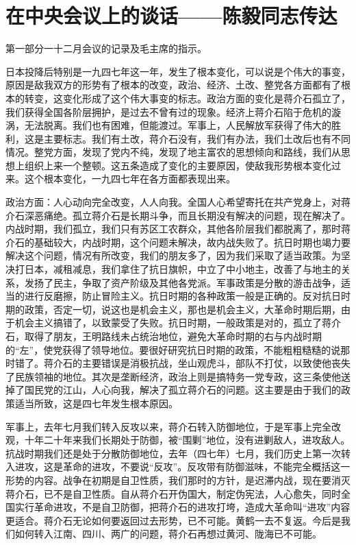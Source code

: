 \section[在中央会议上的谈话——陈毅同志传达（一九四七年十二月）]{在中央会议上的谈话——陈毅同志传达}


第一部分一十二月会议的记录及毛主席的指示。

日本投降后特别是一九四七年这一年，发生了根本变化，可以说是个伟大的事变，原因是敌我双方的形势有了根本的改变，政治、经济、土改、整党各方面都有了根本的转变，这变化形成了这个伟大事变的标志。政治方面的变化是蒋介石孤立了，我们获得全国各阶层拥护，是过去不曾有过的现象。经济上蒋介石陷于危机的漩涡，无法脱离。我们也有困难，但能渡过。军事上，人民解放军获得了伟大的胜利，这是主要标志。我们有土改，蒋介石没有，我们有办法，我们土改后也有不同情况。整党方面，发现了党内不纯，发现了地主富农的思想倾向和路线，我们从思想上组织上来一个整顿。这五条造成了变化的主要原因，使敌我形势根本变化过来。这个根本变化，一九四七年在各方面都表现出来。

政治方面：人心动向完全改变，人人向我。全国人心希望寄托在共产党身上，对蒋介石深恶痛绝。孤立蒋介石是长期斗争，而且长期没有解决的问题，现在解决了。内战时期，我们孤立，我们只有苏区工农群众，其他各阶层我们都脱离了，那时蒋介石的基础较大，内战时期，这个问题未解决，故内战失败了。抗日时期也竭力要解决这个问题，情况有所改变，我们的朋友多了，因为我们采取了适当政策。为坚决打日本，减租减息，我们拿住了抗日旗帜，中立了中小地主，改善了与地主的关系，发扬了民主，争取了资产阶级及其他各党派。军事政策是分散的游击战争，适当的进行反磨擦，防止冒险主义。抗日时期的各种政策一般是正确的。反对抗日时期的政策，否定一切，说这也是机会主义，那也是机会主义，大革命时期后期，由于机会主义搞错了，以致蒙受了失败。抗日时期，一般政策是对的，孤立了蒋介石，取得了朋友，王明路线未占统治地位，避免大革命时期的右与内战时期的“左”，使党获得了领导地位。要很好研究抗日时期的政策，不能粗粗糙糙的说那时错了。蒋介石的主要错误是消极抗战，坐山观虎斗，部队不打仗，以致使他丧失了民族领袖的地位。其次是垄断经济，政治上则是搞特务一党专政，这三条使他送掉了国民党的江山，人心向我，解决了孤立蒋介石的问题。这主要是由于我们的政策适当所致，这是四七年发生根本原因。

军事上，去年七月我们转入反攻以来，蒋介石转入防御地位，于是军事上完全改观，十年二十年来我们长期处于防御，被“围剿”地位，没有进剿敌人，进攻敌人。抗战时期我们还是处于分散防御地位，去年（四七年）七月，我们历史上第一次转入进攻，这是革命的进攻，不要说“反攻”。反攻带有防御滋味，不能完全概括这一形势的内容。战争在初期是自卫性质，我们那时的方针，是迟滞内战，现在要消灭蒋介石，已不是自卫性质。自从蒋介石开伪国大，制定伪宪法，人心愈失，同时全国实行革命进攻，不是自卫防御，把蒋介石的进攻打垮，造成大革命叫“进攻”内容更适合。蒋介石无论如何要返回过去形势，已不可能。黄鹤一去不复返。今后是我们如何转入江南、四川、两广的问题，蒋介石再想过黄河、陇海已不可能。

